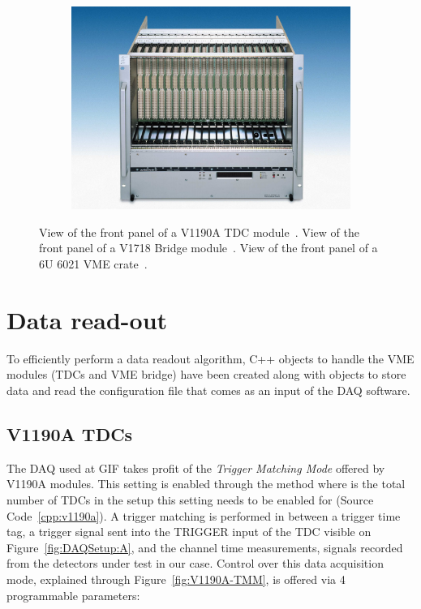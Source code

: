 \begin{figure}[H]
\begin{subfigure}{0.65\linewidth}
			\includegraphics[width = \plotwidth]{fig/app1/Wiener-front.png}
			\caption{\label{fig:DAQSetup:C}}
		\end{subfigure}
		\caption{\label{fig:DAQSetup}  View of the front panel of a V1190A TDC module~\cite{V1190AMUT}.  View of the front panel of a V1718 Bridge module~\cite{V1718MUT}.  View of the front panel of a 6U 6021 VME crate~\cite{6U6000MUT}.}
	\end{figure}

\section{Data read-out}
\label{app1:sec:Data}

	To efficiently perform a data readout algorithm, C++ objects to handle the VME modules (TDCs and VME bridge) have been created along with objects to store data and read the configuration file that comes as an input of the DAQ software.\\

    \subsection{V1190A TDCs}
    \label{app1:ssec:V1190A}

	The DAQ used at GIF takes profit of the \textit{Trigger Matching Mode} offered by V1190A modules. This setting is enabled through the method  where  is the total number of TDCs in the setup this setting needs to be enabled for (Source Code~\ref{cpp:v1190a}). A trigger matching is performed in between a trigger time tag, a trigger signal sent into the TRIGGER input of the TDC visible on Figure~\ref{fig:DAQSetup:A}, and the channel time measurements, signals recorded from the detectors under test in our case. Control over this data acquisition mode, explained through Figure~\ref{fig:V1190A-TMM}, is offered via 4 programmable parameters:
        
